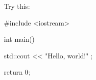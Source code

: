 Try this:
\begin{console}
#include <iostream>

int main()
{
    std::cout << "Hello,          world!\n" ;

    return 0;
}
\end{console}
